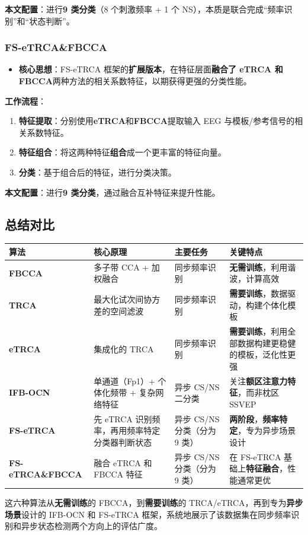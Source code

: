 \documentclass[12pt, a4paper]{ctexart}
\begin{document}
\textbf{本文配置}：进行\textbf{9 类分类}（8 个刺激频率 + 1 个 NS），本质是联合完成``频率识别''和``状态判断''。

\subsubsection*{FS-eTRCA\&FBCCA}

\begin{itemize}
  \item \textbf{核心思想}：FS-eTRCA 框架的\textbf{扩展版本}，在特征层面\textbf{融合了 eTRCA 和 FBCCA}两种方法的相关系数特征，以期获得更强的分类性能。
\end{itemize}

\textbf{工作流程}：

\begin{enumerate}
  \item \textbf{特征提取}：分别使用\textbf{eTRCA}和\textbf{FBCCA}提取输入 EEG 与模板/参考信号的相关系数特征。
  \item \textbf{特征组合}：将这两种特征\textbf{组合}成一个更丰富的特征向量。
  \item \textbf{分类}：基于组合后的特征，进行分类决策。
\end{enumerate}

\textbf{本文配置}：进行\textbf{9 类分类}，通过融合互补特征来提升性能。

\subsection{总结对比}

\begin{table}[h]
\centering\footnotesize
\begin{tabularx}{\textwidth}{lllY}
\toprule
\textbf{算法} & \textbf{核心原理} & \textbf{主要任务} & \textbf{关键特点} \\
\midrule
\textbf{FBCCA} & 多子带 CCA + 加权融合 & 同步频率识别 & \textbf{无需训练}，利用谐波，计算高效 \\
\textbf{TRCA} & 最大化试次间协方差的空间滤波 & 同步频率识别 & \textbf{需要训练}，数据驱动，构建个体化模板 \\
\textbf{eTRCA} & 集成化的 TRCA & 同步频率识别 & \textbf{需要训练}，利用全部数据构建更稳健的模板，泛化性更强 \\
\textbf{IFB-OCN} & 单通道（Fp1）+ 个体化频带 + 复杂网络特征 & 异步 CS/NS 二分类 & 关注\textbf{额区注意力特征}，而非枕区 SSVEP \\
\textbf{FS-eTRCA} & 先 eTRCA 识别频率，再用频率特定分类器判断状态 & 异步 CS/NS 分类（分为 9 类） & \textbf{两阶段}，\textbf{频率特定}，专为异步场景设计 \\
\textbf{FS-eTRCA\&FBCCA} & 融合 eTRCA 和 FBCCA 特征 & 异步 CS/NS 分类（分为 9 类） & 在 FS-eTRCA 基础上\textbf{特征融合}，性能通常更优 \\
\bottomrule
\end{tabularx}
\end{table}

这六种算法从\textbf{无需训练}的 FBCCA，到\textbf{需要训练}的 TRCA/eTRCA，再到专为\textbf{异步场景}设计的 IFB-OCN 和 FS-eTRCA 框架，系统地展示了该数据集在同步频率识别和异步状态检测两个方向上的评估广度。
\end{document}
